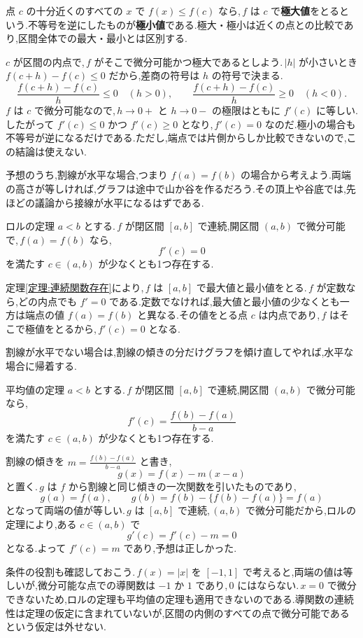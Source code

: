 点 $c$ の十分近くのすべての $x$ で $f(x)\le f(c)$ なら,\,$f$ は $c$ で\textbf{極大値}をとるという.不等号を逆にしたものが\textbf{極小値}である.極大・極小は近くの点との比較であり,区間全体での最大・最小とは区別する.

$c$ が区間の内点で,\,$f$ がそこで微分可能かつ極大であるとしよう.\,$|h|$ が小さいとき $f(c+h)-f(c)\le0$ だから,差商の符号は $h$ の符号で決まる.
\[
 \frac{f(c+h)-f(c)}{h}\le0\quad(h>0),\qquad
 \frac{f(c+h)-f(c)}{h}\ge0\quad(h<0).
\]
$f$ は $c$ で微分可能なので,\,$h\to0+$ と $h\to0-$ の極限はともに $f'(c)$ に等しい.したがって $f'(c)\le0$ かつ $f'(c)\ge0$ となり,\,$f'(c)=0$ なのだ.極小の場合も不等号が逆になるだけである.ただし,端点では片側からしか比較できないので,この結論は使えない.

予想のうち,割線が水平な場合,つまり $f(a)=f(b)$ の場合から考えよう.両端の高さが等しければ,グラフは途中で山か谷を作るだろう.その頂上や谷底では,先ほどの議論から接線が水平になるはずである.

\begin{theorem}{ロルの定理}\label{定理:ロル}
$a<b$ とする.\,$f$ が閉区間 $[a,b]$ で連続,開区間 $(a,b)$ で微分可能で,\,$f(a)=f(b)$ なら,
\[
 f'(c)=0
\]
を満たす $c\in(a,b)$ が少なくとも1つ存在する.
\end{theorem}

定理\ref{定理:連続関数存在}により,\,$f$ は $[a,b]$ で最大値と最小値をとる.\,$f$ が定数なら,どの内点でも $f'=0$ である.定数でなければ,最大値と最小値の少なくとも一方は端点の値 $f(a)=f(b)$ と異なる.その値をとる点 $c$ は内点であり,\,$f$ はそこで極値をとるから,\,$f'(c)=0$ となる.

割線が水平でない場合は,割線の傾きの分だけグラフを傾け直してやれば,水平な場合に帰着する.

\begin{theorem}{平均値の定理}\label{定理:平均値}
$a<b$ とする.\,$f$ が閉区間 $[a,b]$ で連続,開区間 $(a,b)$ で微分可能なら,
\[
 f'(c)=\frac{f(b)-f(a)}{b-a}
\]
を満たす $c\in(a,b)$ が少なくとも1つ存在する.
\end{theorem}

割線の傾きを $m=\frac{f(b)-f(a)}{b-a}$ と書き,
\[
 g(x)=f(x)-m(x-a)
\]
と置く.\,$g$ は $f$ から割線と同じ傾きの一次関数を引いたものであり,
\[
 g(a)=f(a),\qquad g(b)=f(b)-\{f(b)-f(a)\}=f(a)
\]
となって両端の値が等しい.\,$g$ は $[a,b]$ で連続,\,$(a,b)$ で微分可能だから,ロルの定理により,ある $c\in(a,b)$ で
\[
 g'(c)=f'(c)-m=0
\]
となる.よって $f'(c)=m$ であり,予想は正しかった.

条件の役割も確認しておこう.\,$f(x)=|x|$ を $[-1,1]$ で考えると,両端の値は等しいが,微分可能な点での導関数は $-1$ か $1$ であり,\,$0$ にはならない.\,$x=0$ で微分できないため,ロルの定理も平均値の定理も適用できないのである.導関数の連続性は定理の仮定に含まれていないが,区間の内側のすべての点で微分可能であるという仮定は外せない.

%
